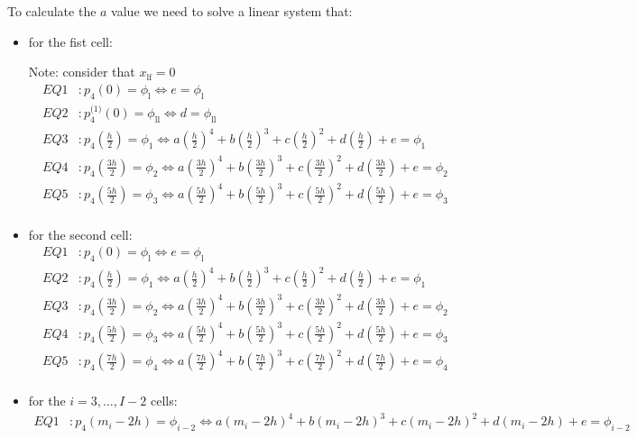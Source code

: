 \documentclass[12pt,a4paper]{article}
\newcommand{\phil}{\phi_\text{l}}
\newcommand{\phill}{\phi_{\text{ll}}}
\newcommand{\xlf}{x_{\text{lf}}}
\begin{document}
To calculate the $a$ value we need to solve a linear system that:
\begin{itemize}
\item for the fist cell:

Note: consider that $\xlf=0$
\begin{align*}
EQ1&:p_4(0)=\phil\Leftrightarrow e =\phil\\
EQ2&:p_4^{\text{(1)}}(0)=\phill\Leftrightarrow d=\phill\\
EQ3&:p_4\left(\frac{h}{2}\right)=\phi_1\Leftrightarrow a\left(\frac{h}{2}\right)^4+b\left(\frac{h}{2}\right)^3+c\left(\frac{h}{2}\right)^2+d\left(\frac{h}{2}\right)+e=\phi_1\\
EQ4&:p_4\left(\frac{3h}{2}\right)=\phi_2\Leftrightarrow a\left(\frac{3h}{2}\right)^4+b\left(\frac{3h}{2}\right)^3+c\left(\frac{3h}{2}\right)^2+d\left(\frac{3h}{2}\right)+e=\phi_2\\
EQ5&:p_4\left(\frac{5h}{2}\right)=\phi_3\Leftrightarrow a\left(\frac{5h}{2}\right)^4+b\left(\frac{5h}{2}\right)^3+c\left(\frac{5h}{2}\right)^2+d\left(\frac{5h}{2}\right)+e=\phi_3\\
\end{align*}
%
\item for the second cell:
\begin{align*}
EQ1&:p_4(0)=\phil\Leftrightarrow e =\phil\\
EQ2&:p_4\left(\frac{h}{2}\right)=\phi_1\Leftrightarrow a\left(\frac{h}{2}\right)^4+b\left(\frac{h}{2}\right)^3+c\left(\frac{h}{2}\right)^2+d\left(\frac{h}{2}\right)+e=\phi_1\\
EQ3&:p_4\left(\frac{3h}{2}\right)=\phi_2\Leftrightarrow a\left(\frac{3h}{2}\right)^4+b\left(\frac{3h}{2}\right)^3+c\left(\frac{3h}{2}\right)^2+d\left(\frac{3h}{2}\right)+e=\phi_2\\
EQ4&:p_4\left(\frac{5h}{2}\right)=\phi_3\Leftrightarrow a\left(\frac{5h}{2}\right)^4+b\left(\frac{5h}{2}\right)^3+c\left(\frac{5h}{2}\right)^2+d\left(\frac{5h}{2}\right)+e=\phi_3\\
EQ5&:p_4\left(\frac{7h}{2}\right)=\phi_4\Leftrightarrow a\left(\frac{7h}{2}\right)^4+b\left(\frac{7h}{2}\right)^3+c\left(\frac{7h}{2}\right)^2+d\left(\frac{7h}{2}\right)+e=\phi_4\\
\end{align*}
%
\item for the $i=3,\ldots,I-2$ cells:
\begin{align*}
EQ1&:p_4\left(m_i-2h\right)=\phi_{i-2}\Leftrightarrow a\left(m_i-2h\right)^4+b\left(m_i-2h\right)^3+c\left(m_i-2h\right)^2+d\left(m_i-2h\right)+e=\phi_{i-2}\\

\end{align*}
\end{itemize}
\end{document}
